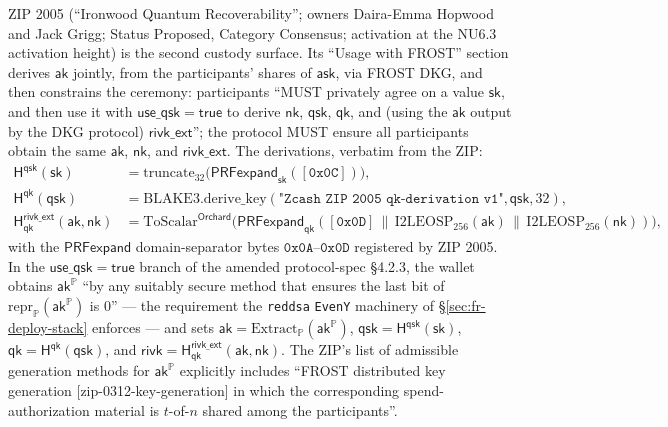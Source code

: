 \documentclass[11pt,a4paper]{article}
\theoremstyle{definition}
\newcommand{\ask}{\ensuremath{\mathsf{ask}}}
\newcommand{\aksym}{\ensuremath{\mathsf{ak}}}
\newcommand{\nksym}{\ensuremath{\mathsf{nk}}}
\begin{document}
ZIP 2005 (``Ironwood Quantum Recoverability''; owners Daira-Emma Hopwood
and Jack Grigg; Status Proposed, Category Consensus; activation at the
NU6.3 activation height) is the second custody surface. Its ``Usage with
FROST'' section derives $\aksym$ jointly, from the participants' shares of
$\ask$, via FROST DKG, and then constrains the ceremony: participants
``MUST privately agree on a value $\mathsf{sk}$, and then use it with
$\mathsf{use\_qsk} = \mathsf{true}$ to derive $\nksym$,
$\mathsf{qsk}$, $\mathsf{qk}$, and (using the $\aksym$ output by the
DKG protocol) $\mathsf{rivk\_ext}$''; the protocol MUST ensure all
participants obtain the same $\aksym$, $\nksym$, and
$\mathsf{rivk\_ext}$. The derivations, verbatim from the ZIP:
\begin{align*}
\mathsf{H}^{\mathsf{qsk}}(\mathsf{sk}) &=
  \mathrm{truncate}_{32}\bigl(\mathsf{PRFexpand}_{\mathsf{sk}}
  ([\mathtt{0x0C}])\bigr), \\
\mathsf{H}^{\mathsf{qk}}(\mathsf{qsk}) &=
  \mathrm{BLAKE3.derive\_key}(\texttt{"Zcash ZIP 2005 qk-derivation
  v1"}, \mathsf{qsk}, 32), \\
\mathsf{H}^{\mathsf{rivk\_ext}}_{\mathsf{qk}}(\aksym, \nksym) &=
  \mathrm{ToScalar}^{\mathsf{Orchard}}\bigl(
  \mathsf{PRFexpand}_{\mathsf{qk}}([\mathtt{0x0D}] \,\|\,
  \mathrm{I2LEOSP}_{256}(\aksym) \,\|\,
  \mathrm{I2LEOSP}_{256}(\nksym))\bigr),
\end{align*}
with the $\mathsf{PRFexpand}$ domain-separator bytes
$\mathtt{0x0A}$--$\mathtt{0x0D}$ registered by ZIP 2005. In the
$\mathsf{use\_qsk} = \mathsf{true}$ branch of the amended protocol-spec
\S4.2.3, the wallet obtains $\aksym^{\mathbb{P}}$ ``by any suitably
secure method that ensures the last bit of
$\mathrm{repr}_{\mathbb{P}}(\aksym^{\mathbb{P}})$ is 0'' --- the
requirement the \texttt{reddsa} \texttt{EvenY} machinery of
\S\ref{sec:fr-deploy-stack} enforces --- and sets $\aksym =
\mathrm{Extract}_{\mathbb{P}}(\aksym^{\mathbb{P}})$, $\mathsf{qsk} =
\mathsf{H}^{\mathsf{qsk}}(\mathsf{sk})$, $\mathsf{qk} =
\mathsf{H}^{\mathsf{qk}}(\mathsf{qsk})$, and $\mathsf{rivk} =
\mathsf{H}^{\mathsf{rivk\_ext}}_{\mathsf{qk}}(\aksym, \nksym)$.
The ZIP's list of admissible generation methods for
$\aksym^{\mathbb{P}}$ explicitly includes ``FROST distributed key
generation [zip-0312-key-generation] in which the corresponding
spend-authorization material is $t$-of-$n$ shared among the
participants''.
\end{document}
